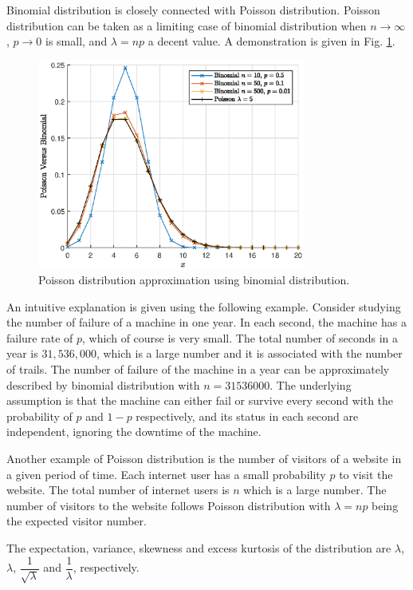 Binomial distribution is closely connected with Poisson distribution. Poisson distribution can be taken as a limiting case of binomial distribution when $n\rightarrow\infty$, $p\rightarrow 0$ is small, and $\lambda = np$ a decent value. A demonstration is given in Fig. \ref{fig:poisson_vs_b}.
\begin{figure}[!htb]
	\centering
	\includegraphics[width=250pt]{chapters/part-1/figures/poisson_vs_b.eps}
	\caption{Poisson distribution approximation using binomial distribution.} \label{fig:poisson_vs_b}
\end{figure}

An intuitive explanation is given using the following example. Consider studying the number of failure of a machine in one year. In each second, the machine has a failure rate of $p$, which of course is very small. The total number of seconds in a year is $31,536,000$, which is a large number and it is associated with the number of trails. The number of failure of the machine in a year can be approximately described by binomial distribution with $n=31536000$. The underlying assumption is that the machine can either fail or survive every second with the probability of $p$ and $1-p$ respectively, and its status in each second are independent, ignoring the downtime of the machine.

Another example of Poisson distribution is the number of visitors of a website in a given period of time. Each internet user has a small probability $p$ to visit the website. The total number of internet users is $n$ which is a large number. The number of visitors to the website follows Poisson distribution with $\lambda=np$ being the expected visitor number.

The expectation, variance, skewness and excess kurtosis of the distribution are $\lambda$, $\lambda$, $\dfrac{1}{\sqrt{\lambda}}$ and $\dfrac{1}{\lambda}$, respectively.

